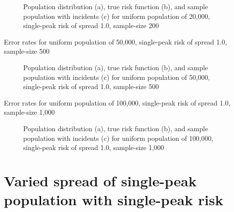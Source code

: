 \begin{figure}[H]
    
    \caption[]{Population distribution (a), true risk function (b), and sample population with incidents (c) for uniform population of 20,000, single-peak risk of \gls{spread} 1.0, sample-size 200}
    \label{fig:distributions:unif20k_200_1.0_1h}    
\end{figure}



\begin{table}[H]
    
    \caption[]{Error rates for uniform population of 50,000, single-peak risk of \gls{spread} 1.0, sample-size 500}
    \label{tab:mean_error_rates:unif50k_500_1.0_1h}
\end{table}

\begin{figure}[H]
    
    \caption[]{Population distribution (a), true risk function (b), and sample population with incidents (c) for uniform population of 50,000, single-peak risk of \gls{spread} 1.0, sample-size 500}
    \label{fig:distributions:unif50k_500_1.0_1h}    
\end{figure}



\begin{table}[H]
    
    \caption[]{Error rates for uniform population of 100,000, single-peak risk of \gls{spread} 1.0, sample-size 1,000}
    \label{tab:mean_error_rates:unif100k_1000_1.0_1h}
\end{table}

\begin{figure}[H]
    
    \caption[]{Population distribution (a), true risk function (b), and sample population with incidents (c) for uniform population of 100,000, single-peak risk of \gls{spread} 1.0, sample-size 1,000}
    \label{fig:distributions:unif100k_1000_1.0_1h}    
\end{figure}



\section{Varied spread of single-peak population with single-peak risk}
\label{sec:app:results_pX_100_1.0_1h}

